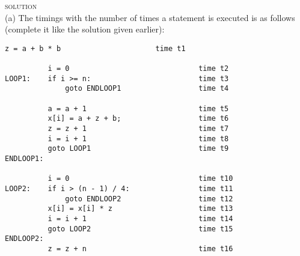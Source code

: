 \textsc{solution}\\
(a) The timings with the number of times a statement is executed
is as follows (complete it like the solution given earlier):
\begin{Verbatim}[frame=single]
          z = a + b * b                      time t1

          i = 0                              time t2
LOOP1:    if i >= n:                         time t3
              goto ENDLOOP1                  time t4
 
          a = a + 1                          time t5
          x[i] = a + z + b;                  time t6
          z = z + 1                          time t7
          i = i + 1                          time t8
          goto LOOP1                         time t9
ENDLOOP1:

          i = 0                              time t10
LOOP2:    if i > (n - 1) / 4:                time t11
              goto ENDLOOP2                  time t12
          x[i] = x[i] * z                    time t13
          i = i + 1                          time t14
          goto LOOP2                         time t15
ENDLOOP2:
          z = z + n                          time t16   
\end{Verbatim}


